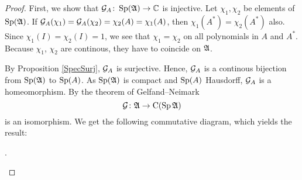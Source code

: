 \begin{proof}
 First, we show that $\mathcal{G}_A \colon \operatorname{Sp}(\mathfrak{A}) \to \mathbb{C}$ is injective. Let 
 $\chi_1 , \chi_2$ be elements of $\operatorname{Sp}(\mathfrak{A})$. If $\mathcal{G}_A(\chi_1) = \mathcal{G}_A(\chi_2)=
 \chi_2(A)=\chi_1(A)$, then $\chi_1(A^*)=\chi_2(A^*)$ also. Since 
 $\chi_1(I)=\chi_2(I)=1$, we see that $\chi_1 = \chi_2$ on all polynomials
 in $A$ and $A^*$. Because $\chi_1$, $\chi_2$ are continous, they have to coincide on
 $\mathfrak{A}$. 
 
 By Proposition \ref{SpecSurj}, $\mathcal{G}_A$ is surjective. Hence, $\mathcal{G}_A$ is a continous bijection 
 from $\operatorname{Sp}(\mathfrak{A})$ to $\operatorname{Sp}(A)$. As $\operatorname{Sp}(\mathfrak{A})$ is compact and $\operatorname{Sp}(A)$ Hausdorff,
 $\mathcal{G}_A$ is a homeomorphism.
By the theorem of Gelfand--Neimark 
\[
 \mathcal{G} \colon \mathfrak{A} \to \operatorname{C}(\operatorname{Sp} \mathfrak{A})
\]
is an isomorphism. We get the following commutative diagram, which yields the result:

% 
% 
%  
% 
%   
\pagebreak
 \begin{center}
 .
 \end{center}

 




\end{proof}


